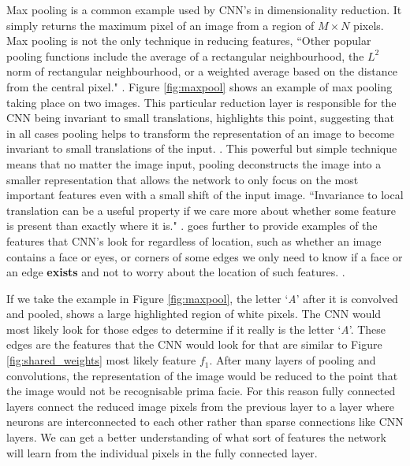 \documentclass[report, 11pt, oneside]{dissertation}
\begin{document}
Max pooling is a common example used by CNN's in dimensionality reduction. It simply returns the maximum pixel of an image from a region of $ M \times N $ pixels. Max pooling is not the only technique in reducing features, ``Other popular pooling functions include the average of a rectangular neighbourhood, the $L^2$ norm of rectangular neighbourhood, or a weighted average based on the distance from the central pixel." \citep[330]{Goodfellow-et-al-2016}. Figure \ref{fig:maxpool} shows an example of max pooling taking place on two images. This particular reduction layer is responsible for the CNN being invariant to small translations, \citeauthor{Goodfellow-et-al-2016} highlights this point, suggesting that in all cases pooling helps to transform the representation of an image to become invariant to small translations of the input. \citeyearpar[330]{Goodfellow-et-al-2016}. This powerful but simple technique means that no matter the image input, pooling deconstructs the image into a smaller representation that allows the network to only focus on the most important features even with a small shift of the input image. ``Invariance to local translation can be a useful property if we care more about whether some feature is present than exactly where it is." \citep[331]{Goodfellow-et-al-2016}. \citeauthor{Goodfellow-et-al-2016} goes further to provide examples of the features that CNN's look for regardless of location, such as whether an image contains a face or eyes, or corners of some edges we only need to know if a face or an edge \textbf{exists} and not to worry about the location of such features. \citeyearpar[331]{Goodfellow-et-al-2016}.


If we take the example in Figure \ref{fig:maxpool}, the letter `\textit{A}' after it is convolved and pooled, shows a large highlighted region of white pixels. The CNN would most likely look for those edges to determine if it really is the letter `\textit{A}'. These edges are the features that the CNN would look for that are similar to Figure \ref{fig:shared_weights} most likely feature \textit{$f_1$}. After many layers of pooling and convolutions, the representation of the image would be reduced to the point that the image would not be recognisable prima facie. For this reason fully connected layers connect the reduced image pixels from the previous layer to a layer where neurons are interconnected to each other rather than sparse connections like CNN layers. We can get a better understanding of what sort of features the network will learn from the individual pixels in the fully connected layer.
\end{document}
